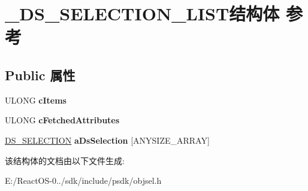 \hypertarget{struct___d_s___s_e_l_e_c_t_i_o_n___l_i_s_t}{}\section{\+\_\+\+D\+S\+\_\+\+S\+E\+L\+E\+C\+T\+I\+O\+N\+\_\+\+L\+I\+S\+T结构体 参考}
\label{struct___d_s___s_e_l_e_c_t_i_o_n___l_i_s_t}
\subsection*{Public 属性}
\begin{DoxyCompactItemize}
\item 
\mbox{\label{struct___d_s___s_e_l_e_c_t_i_o_n___l_i_s_t_a6bd6acab544b199be46c1227ff6ae4a2}} 
U\+L\+O\+NG {\bfseries c\+Items}
\item 
\mbox{\label{struct___d_s___s_e_l_e_c_t_i_o_n___l_i_s_t_a782bd9ac3a7029e1c46482e90a2f0351}} 
U\+L\+O\+NG {\bfseries c\+Fetched\+Attributes}
\item 
\mbox{\label{struct___d_s___s_e_l_e_c_t_i_o_n___l_i_s_t_a54b2ef11224794fe4052a7db617e8a10}} 
\hyperlink{struct___d_s___s_e_l_e_c_t_i_o_n}{D\+S\+\_\+\+S\+E\+L\+E\+C\+T\+I\+ON} {\bfseries a\+Ds\+Selection} \mbox{[}A\+N\+Y\+S\+I\+Z\+E\+\_\+\+A\+R\+R\+AY\mbox{]}
\end{DoxyCompactItemize}


该结构体的文档由以下文件生成\+:\begin{DoxyCompactItemize}
\item 
E\+:/\+React\+O\+S-\/0../sdk/include/psdk/objsel.\+h\end{DoxyCompactItemize}
